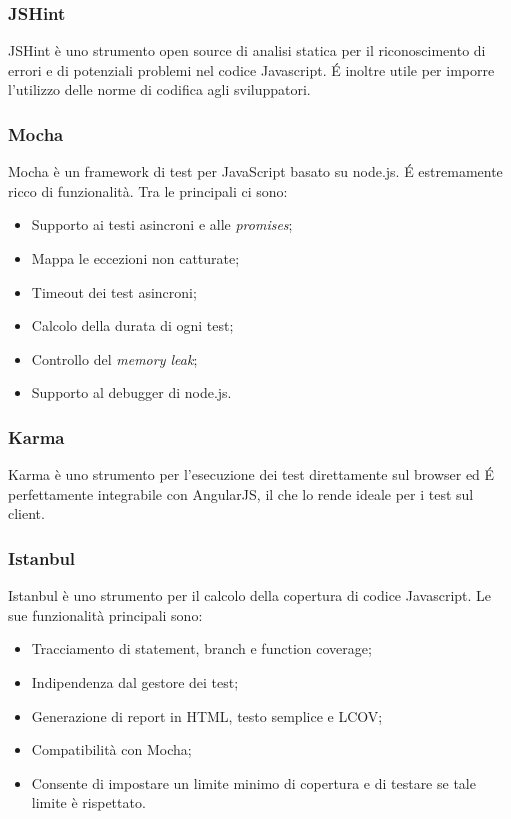 \subsubsection{JSHint}
JSHint è uno strumento open source di analisi statica per il riconoscimento di errori e di potenziali problemi nel codice Javascript. \'E inoltre utile per imporre l'utilizzo delle norme di codifica agli sviluppatori.

\subsubsection{Mocha}
Mocha è un framework di test per  JavaScript basato su node.js. \'E estremamente ricco di funzionalità. Tra le principali ci sono:
\begin{itemize}
\item Supporto ai testi asincroni e alle \textit{promises};
\item Mappa le eccezioni non catturate;
\item Timeout dei test asincroni;
\item Calcolo della durata di ogni test;
\item Controllo del \textit{memory leak};
\item Supporto al debugger di node.js.
\end{itemize}

\subsubsection{Karma}
Karma è uno strumento per l'esecuzione dei test direttamente sul browser ed \'E perfettamente integrabile con AngularJS, il che lo rende ideale per i test sul client.


\subsubsection{Istanbul}
\label{Istabull}
Istanbul è uno strumento per il calcolo della copertura di codice Javascript. Le sue funzionalità principali sono:
\begin{itemize}
\item Tracciamento di statement, branch e function coverage;
\item Indipendenza dal gestore dei test;
\item Generazione di report in HTML, testo semplice e LCOV;
\item Compatibilità con Mocha;
\item Consente di impostare un limite minimo di copertura e di testare se tale limite è rispettato.
\end{itemize}



